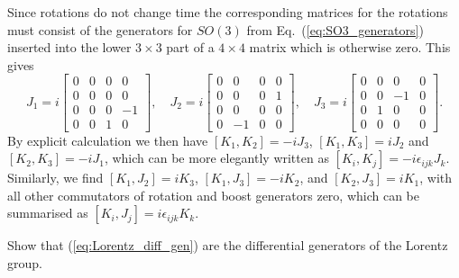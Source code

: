 \documentclass[notes.tex]{subfiles}
\begin{document}
\begin{Answer}
Since rotations do not change time the corresponding matrices for the rotations must consist of the generators for $SO(3)$ from Eq.~(\ref{eq:SO3_generators}) inserted into the lower $3\times3$ part of a $4\times4$ matrix which is otherwise zero. This gives
\[ J_1 = i\left[\begin{matrix} 0 & 0  & 0 &  0\\  0 & 0 & 0 & 0 \\  0 & 0 & 0 & -1 \\ 0 & 0 & 1 & 0 \end{matrix}\right], \quad 
J_2 = i\left[\begin{matrix} 0 & 0  & 0 &  0\\  0 & 0 & 0 & 1 \\  0 & 0 & 0 & 0 \\ 0 & -1 & 0 & 0 \end{matrix}\right], \quad
J_3 = i\left[\begin{matrix} 0 & 0  & 0 &  0\\  0 & 0 & -1 & 0 \\  0 & 1 & 0 & 0 \\ 0 & 0 & 0 & 0 \end{matrix}\right].  \]
By explicit calculation we then have $[K_1,K_2] =-iJ_3$, $[K_1,K_3] =iJ_2$ and  $[K_2,K_3] =-iJ_1$, which can be more elegantly written as  $[K_i,K_j] =-i\epsilon_{ijk}J_k$. Similarly, we find $[K_1,J_2] =iK_3$, $[K_1,J_3] =-iK_2$, and $[K_2,J_3] =iK_1$, with all other commutators of rotation and boost generators zero, which can be summarised as $[K_i,J_j] =i\epsilon_{ijk}K_k$.
\end{Answer}


\begin{Exercise}[label=ex:Lorentz_diff_gem]
Show that (\ref{eq:Lorentz_diff_gen}) are the differential generators of the Lorentz group.
\end{Exercise}
\end{document}
